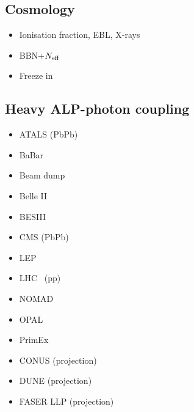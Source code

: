 \documentclass[9pt,twocolumn]{extarticle}
\begin{document}
\begin{mdframed}[everyline=true]
\subsection*{Cosmology}\vspace{-0.5em}
\begin{itemize}\setlength\itemsep{-0.5em}
    \item Ionisation fraction, EBL, X-rays~\cite{Cadamuro:2011fd}
    \item BBN+$N_{\rm eff}$~\cite{Depta:2020wmr}
    \item Freeze in~\cite{Langhoff:2022bij}
\end{itemize}
\end{mdframed}

\newpage

\begin{mdframed}
\vspace{-1em}
\section{Heavy ALP-photon coupling}\vspace{-0.5em}
\begin{itemize}\setlength\itemsep{-0.5em}
    \item ATALS (PbPb)~\cite{ATLAS:2020hii}
    \item BaBar~\cite{Dolan:2017osp}
    \item Beam dump~\cite{CHARM:1985anb,Riordan:1987aw,Dolan:2017osp,Blumlein:1990ay,NA64:2020qwq}
    \item Belle II~\cite{Belle-II:2020jti}
    \item BESIII~\cite{BESIII:2022rzz}
    \item CMS (PbPb)~\cite{CMS:2018erd}
    \item LEP~\cite{Jaeckel:2015jla}
    \item LHC~ (pp)\cite{Knapen:2016moh}
    \item NOMAD~\cite{NOMAD:2000usb}
	 \item OPAL~\cite{Knapen:2016moh}
	 \item PrimEx~\cite{PrimEx:2010fvg}
	     \item CONUS (projection)~\cite{Dent:2019ueq}
    \item DUNE (projection)~\cite{Brdar:2020dpr}
    \item FASER LLP (projection)~\cite{FASER:2018eoc}
\end{itemize}
\end{mdframed}
\end{document}
